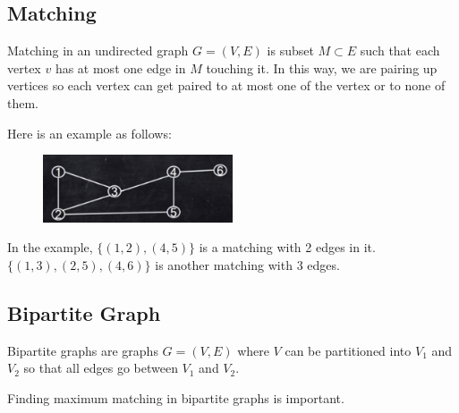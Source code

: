 \subsection{Matching}
Matching in an undirected graph $G=(V, E)$ is subset $M \subset E$ such that each vertex $v$ has at most one edge in $M$ touching it. In this way, we are pairing up vertices so each vertex can get paired to at most one of the vertex or to none of them.

Here is an example as follows:

\begin{figure}[H]
	\centering
	\includegraphics[width=0.5\textwidth]{fig/match.png}
\end{figure} 

In the example, $\{(1, 2), (4, 5)\}$ is a matching with 2 edges in it. $\{(1, 3), (2, 5), (4, 6)\}$ is another matching with 3 edges.

\subsection{Bipartite Graph}
Bipartite graphs are graphs $G = (V, E)$ where $V$ can be partitioned into $V_1$ and $V_2$ so that all edges go between $V_1$ and $V_2$.

Finding maximum matching in bipartite graphs is important.

